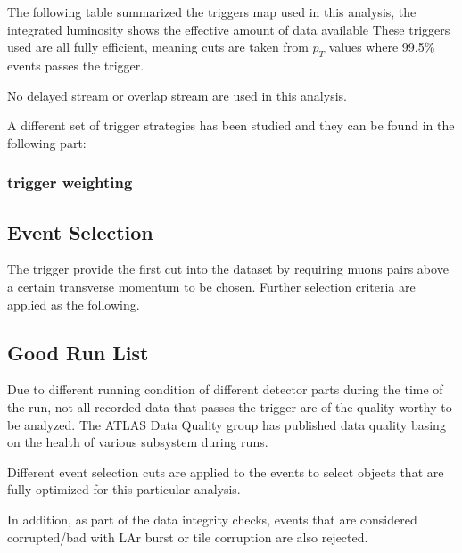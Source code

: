 The following table summarized the triggers map used in this analysis, the integrated luminosity shows the effective amount of data available
These triggers used are all fully efficient, meaning cuts are taken from $p_{T}$ values where 99.5\% events passes the trigger.

No delayed stream or overlap stream are used in this analysis. 

A different set of trigger strategies has been studied and they can be found in the following part: 

\subsubsection{trigger weighting}


\subsection{Event Selection}
The trigger provide the first cut into the dataset by requiring muons pairs above a certain transverse momentum to be chosen. Further selection criteria are applied as the following. 

\subsection*{Good Run List}
Due to different running condition of different detector parts during the time of the run, not all recorded data that passes the trigger are of the quality worthy to be analyzed. The ATLAS Data Quality group has published data quality basing on the health of various subsystem during runs. 

Different event selection cuts are applied to the events to select objects that are fully optimized for this particular analysis.  

In addition, as part of the data integrity checks, events that are considered corrupted/bad with LAr burst or tile corruption are also rejected. 





